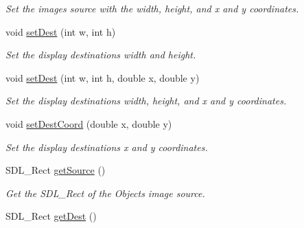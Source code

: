 \begin{DoxyCompactItemize}
\begin{DoxyCompactList}\small\item\em Set the images source with the width, height, and x and y coordinates. \end{DoxyCompactList}\item 
void \hyperlink{classObject_a0ba46a30886b3d30e2b9a8a263b6c9b9}{set\+Dest} (int w, int h)\hypertarget{classObject_a0ba46a30886b3d30e2b9a8a263b6c9b9}{}\label{classObject_a0ba46a30886b3d30e2b9a8a263b6c9b9}

\begin{DoxyCompactList}\small\item\em Set the display destinations width and height. \end{DoxyCompactList}\item 
void \hyperlink{classObject_a9338eab393a21158dd0087b3b9d2e5e2}{set\+Dest} (int w, int h, double x, double y)\hypertarget{classObject_a9338eab393a21158dd0087b3b9d2e5e2}{}\label{classObject_a9338eab393a21158dd0087b3b9d2e5e2}

\begin{DoxyCompactList}\small\item\em Set the display destinations width, height, and x and y coordinates. \end{DoxyCompactList}\item 
void \hyperlink{classObject_a92a957d9f65d973c087367d26b358f0b}{set\+Dest\+Coord} (double x, double y)\hypertarget{classObject_a92a957d9f65d973c087367d26b358f0b}{}\label{classObject_a92a957d9f65d973c087367d26b358f0b}

\begin{DoxyCompactList}\small\item\em Set the display destinations x and y coordinates. \end{DoxyCompactList}\item 
S\+D\+L\+\_\+\+Rect \hyperlink{classObject_a411820194b7a02fcec714a51382c0c0c}{get\+Source} ()\hypertarget{classObject_a411820194b7a02fcec714a51382c0c0c}{}\label{classObject_a411820194b7a02fcec714a51382c0c0c}

\begin{DoxyCompactList}\small\item\em Get the S\+D\+L\+\_\+\+Rect of the Objects image source. \end{DoxyCompactList}\item 
S\+D\+L\+\_\+\+Rect \hyperlink{classObject_ab081a97a21c840bbcf3fd8ed3510f71d}{get\+Dest} ()\hypertarget{classObject_ab081a97a21c840bbcf3fd8ed3510f71d}{}\label{classObject_ab081a97a21c840bbcf3fd8ed3510f71d}


\end{DoxyCompactItemize}
